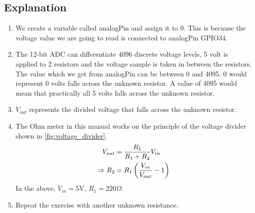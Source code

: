 \subsection{Explanation}
\begin{enumerate}

\item We create a variable called analogPin and assign it to 0. This is because 
the voltage value we are going to read is connected to analogPin GPIO34.

\item  The 12-bit ADC can differentiate 4096 discrete voltage levels, 5 volt is 
applied to 2 resistors and the voltage sample is taken in between the resistors.
The value which we get from analogPin can be between 0 and 4095. 0 would 
represent 0 volts falls across the unknown resistor. A value of 4095 would mean 
that practically all 5 volts falls across the unknown resistor.

\item  $V_{out}$ represents the divided voltage that falls across the unknown 
resistor.

\item  The Ohm meter in this manual works on the principle of the voltage
divider shown in \autoref{fig:voltage_divider}.
\begin{align}
V_{out}&=\frac{R_1}{R_1+R_2}V_{in} \\
\Rightarrow R_2&=R_1\left(\frac{V_{in}}{V_{out}}-1\right)
\end{align}
In the above, $V_{in} = 5$V, $R_1 = 220 \Omega$.
\item Repeat the exercise with another unknown resistance.
\end{enumerate}
